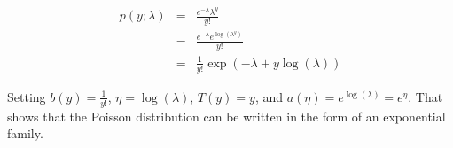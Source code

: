 \begin{answer}
\begin{eqnarray*}
  p(y; \lambda) &=& \frac{e^{-\lambda}\lambda^y}{y!}\\
  &=& \frac{e^{-\lambda}e^{\log(\lambda^y)}}{y!}\\
  &=& \frac{1}{y!}\exp(-\lambda + y \log(\lambda))
\end{eqnarray*}

Setting $b(y) =\frac{1}{y!} $, $\eta =\log(\lambda) $, $T(y) = y$, and $a(\eta)= e^{\log(\lambda)} = e^{\eta}$. That shows that the Poisson distribution can be written in the form of an exponential family.

\end{answer}
